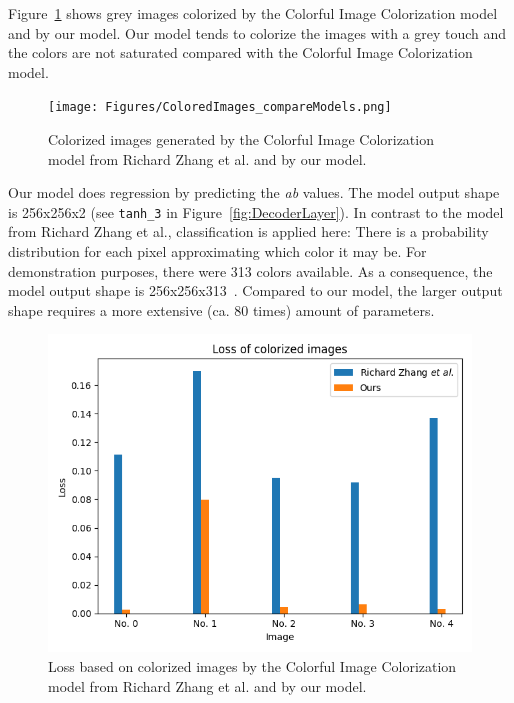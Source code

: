 \documentclass[a4paper,12pt, listof=totoc,toc=sectionentrywithdots]{scrartcl}
\begin{document}
Figure~\ref{fig:ColoredImages_compareModels} shows grey images colorized by the Colorful Image Colorization model~\cite{colorize} and by our model. 
Our model tends to colorize the images with a grey touch and the colors are not saturated compared with the Colorful Image Colorization model.



\begin{figure}
\centering
        \texttt{[image: Figures/ColoredImages\_compareModels.png]}
    \caption{Colorized images generated by the Colorful Image Colorization model from Richard Zhang et al. and by our model.}
    \label{fig:ColoredImages_compareModels}
\end{figure}


Our model does regression by predicting the \textit{ab} values.
The model output shape is 256x256x2 (see \texttt{tanh\_3} in Figure~\ref{fig:DecoderLayer}).
In contrast to the model from Richard Zhang et al., classification is applied here:
There is a probability distribution for each pixel approximating which color it may be.
For demonstration purposes, there were 313 colors available.
As a consequence, the model output shape is 256x256x313~\cite{colorize}.
Compared to our model, the larger output shape requires a more extensive (ca. 80 times) amount of parameters.



\begin{figure}[h]
\centering
        \includegraphics[totalheight=6cm]{Figures/ColorizedImagesLossPlot_comparedModels.png}
    \caption{Loss based on colorized images by the 
    Colorful Image Colorization model from Richard Zhang et al. and by our model.}
    \label{fig:Loss_compareModels}
\end{figure}
\end{document}
